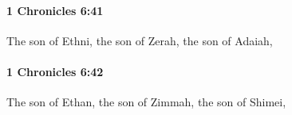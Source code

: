		\paragraph{1 Chronicles 6:41} %
			\label{1CHRONICLES-6-41}

			The son of Ethni, the son of Zerah, the son of Adaiah,


		\paragraph{1 Chronicles 6:42} %
			\label{1CHRONICLES-6-42}

			The son of Ethan, the son of Zimmah, the son of Shimei,


